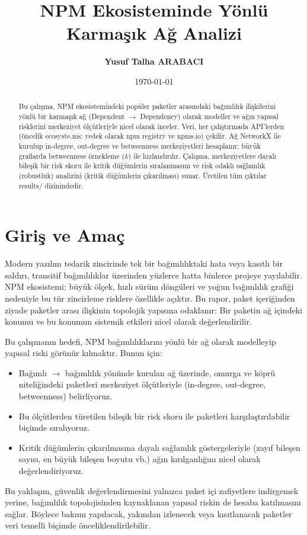 \documentclass[11pt,a4paper]{article}
\title{NPM Ekosisteminde Yönlü Karmaşık Ağ Analizi}
\author{\textbf{Yusuf Talha ARABACI}}
\date{\today}
\begin{document}
\maketitle

\begin{abstract}
Bu çalışma, NPM ekosistemindeki popüler paketler arasındaki bağımlılık ilişkilerini yönlü bir karmaşık ağ (Dependent $\to$ Dependency) olarak modeller ve ağın yapısal risklerini merkeziyet ölçütleriyle nicel olarak inceler. Veri, her çalıştırmada API'lerden (öncelik ecosyste.ms; yedek olarak npm registry ve npms.io) çekilir. Ağ NetworkX ile kurulup in-degree, out-degree ve betweenness merkeziyetleri hesaplanır; büyük graflarda betweenness örnekleme ($k$) ile hızlandırılır. Çalışma, merkeziyetlere dayalı bileşik bir risk skoru ile kritik düğümlerin sıralanmasını ve risk odaklı sağlamlık (robustluk) analizini (kritik düğümlerin çıkarılması) sunar. Üretilen tüm çıktılar results/ dizinindedir.
\end{abstract}

\clearpage

\section{Giriş ve Amaç}
Modern yazılım tedarik zincirinde tek bir bağımlılıktaki hata veya kasıtlı bir saldırı, transitif bağımlılıklar üzerinden yüzlerce hatta binlerce projeye yayılabilir. NPM ekosistemi; büyük ölçek, hızlı sürüm döngüleri ve yoğun bağımlılık grafiği nedeniyle bu tür zincirleme risklere özellikle açıktır. Bu rapor, paket içeriğinden ziyade paketler arası ilişkinin topolojik yapısına odaklanır: Bir paketin ağ içindeki konumu ve bu konumun sistemik etkileri nicel olarak değerlendirilir.

Bu çalışmanın hedefi, NPM bağımlılıklarını yönlü bir ağ olarak modelleyip yapısal riski görünür kılmaktır. Bunun için:
\begin{itemize}
  \item Bağımlı $\to$ bağımlılık yönünde kurulan ağ üzerinde, omurga ve köprü niteliğindeki paketleri merkeziyet ölçütleriyle (in-degree, out-degree, betweenness) belirliyoruz.
  \item Bu ölçütlerden türetilen bileşik bir risk skoru ile paketleri karşılaştırılabilir biçimde sıralıyoruz.
  \item Kritik düğümlerin çıkarılmasına dayalı sağlamlık göstergeleriyle (zayıf bileşen sayısı, en büyük bileşen boyutu vb.) ağın kırılganlığını nicel olarak değerlendiriyoruz.
\end{itemize}
Bu yaklaşım, güvenlik değerlendirmesini yalnızca paket içi zafiyetlere indirgemek yerine, bağımlılık topolojisinden kaynaklanan yapısal riskin de hesaba katılmasını sağlar. Böylece bakımı yapılacak, yakından izlenecek veya kısıtlanacak paketler veri temelli biçimde önceliklendirilebilir.
\end{document}
